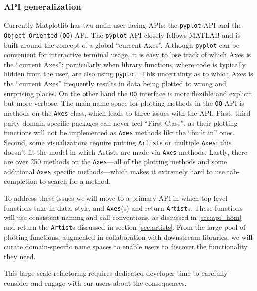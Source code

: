 \documentclass[11pt,letterpaper]{article}  %
\begin{document}
\subsubsection{API generalization}
\label{sec:api_gen}
Currently Matplotlib has two main user-facing APIs: the
\texttt{pyplot} API and the \texttt{Object Oriented} (\texttt{OO})
API.  The \texttt{pyplot} API closely follows MATLAB and is built
around the concept of a global ``current Axes''.
Although \texttt{pyplot} can be convenient for interactive terminal
usage, it is easy to lose track of which Axes is the ``current Axes'';
particularly when library functions, where code is typically hidden
from the user, are also using \texttt{pyplot}.
This uncertainty as to
which Axes is the ``current Axes'' frequently results in data being
plotted to wrong and surprising places.
On the other hand the \texttt{OO} interface is more flexible and
explicit but more verbose.
The main name space for plotting methods in the \texttt{OO} API is
methods on the \texttt{Axes} class, which leads to three issues with
the API.
First, third party domain-specific packages can never feel ``First
Class'', as their plotting functions will not be implemented as
\texttt{Axes} methods like the ``built in'' ones.
Second, some visualizations require putting \texttt{Artist}s on
multiple \texttt{Axes}; this doesn't fit the model in which Artists
are made via \texttt{Axes} methods.
Lastly, there are over 250 methods on the \texttt{Axes}---all of the
plotting methods and some additional \texttt{Axes} specific
methods---which makes it extremely hard to use tab-completion to
search for a method.

To address these issues we will move to a primary API in which
top-level functions take in data, style, and \texttt{Axes}(s) and
return \texttt{Artist}s.  These functions will use consistent naming
and call conventions, as discussed in \ref{sec:api_hom} and return the
\texttt{Artist}s discussed in section \ref{sec:artists}.  From the
large pool of plotting functions, augmented in collaboration with
downstream libraries, we will curate domain-specific name spaces to
enable users to discover the functionality they need.

This large-scale refactoring requires dedicated developer time to
carefully consider and engage with our users about the consequences.

\end{document}
